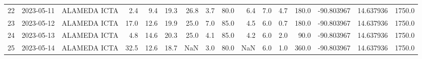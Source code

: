 \documentclass[12pt]{article}
\begin{document}
\begin{center}
\begin{tabular}{lllrrrrrrrrrrrrr}
22  & 2023-05-11 &  ALAMEDA ICTA &     2.4 &   9.4 &   19.3 &  26.8 &      3.7 &     80.0 &        6.4 &  7.0 &         4.7 &       180.0 & -90.803967 &  14.637936 &   1750.0 \\
23  & 2023-05-12 &  ALAMEDA ICTA &    17.0 &  12.6 &   19.9 &  25.0 &      7.0 &     85.0 &        4.5 &  6.0 &         0.7 &       180.0 & -90.803967 &  14.637936 &   1750.0 \\
24  & 2023-05-13 &  ALAMEDA ICTA &     4.8 &  14.6 &   20.3 &  25.0 &      4.1 &     85.0 &        4.2 &  6.0 &         2.0 &        90.0 & -90.803967 &  14.637936 &   1750.0 \\
25  & 2023-05-14 &  ALAMEDA ICTA &    32.5 &  12.6 &   18.7 &   NaN &      3.0 &     80.0 &        NaN &  6.0 &         1.0 &       360.0 & -90.803967 &  14.637936 &   1750.0 \\
\bottomrule
\end{tabular}

        
        \end{center}
        
\end{document}
